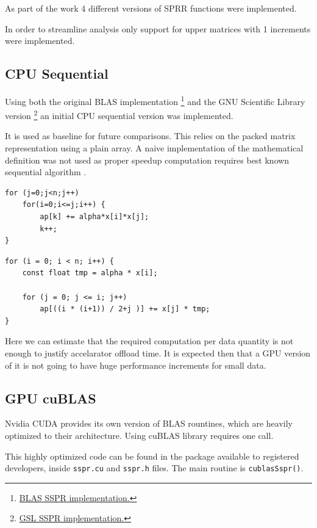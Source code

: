 \documentclass{llncs}
\begin{document}
As part of the work 4 different versions of SPRR functions were implemented.

In order to streamline analysis only support for upper matrices with 1 increments were implemented.

\subsection{CPU Sequential}

Using both the original BLAS implementation \footnote{\href{http://www.netlib.org/blas/sspr.f}{BLAS SSPR implementation.}} and the GNU Scientific Library version \footnote{\href{gsl/blas/source\_spr.h}{GSL SSPR implementation.}} an initial CPU sequential version was implemented. 

It is used as baseline for future comparisons. This relies on the packed matrix representation using a plain array.
A naive implementation of the mathematical definition was not used as proper speedup computation requires best known sequential algorithm \cite{debunking}.

\begin{lstlisting}[caption={Naive SSPR CPU Implementation},label={lst:naive}]
for (j=0;j<n;j++)
	for(i=0;i<=j;i++) {
		ap[k] += alpha*x[i]*x[j];
		k++;
}
\end{lstlisting}

\begin{lstlisting}[caption={Optimized SSPR CPU Implementation},label={lst:cpuopt}]
for (i = 0; i < n; i++) {
	const float tmp = alpha * x[i];

	for (j = 0; j <= i; j++)
		ap[((i * (i+1)) / 2+j )] += x[j] * tmp;
}
\end{lstlisting}

Here we can estimate that the required computation per data quantity is not enough to justify accelarator offload time.
It is expected then that a GPU version of it is not going to have huge performance increments for small data.

\subsection{GPU cuBLAS}

Nvidia CUDA \cite{cuda} provides its own version of BLAS rountines, which are heavily optimized to their architecture. Using cuBLAS \cite{cublas} library requires one call.

This highly optimized code can be found in the package available to registered developers,
inside {\tt sspr.cu} and {\tt sspr.h} files. The main routine is {\tt cublasSspr()}.
\end{document}

